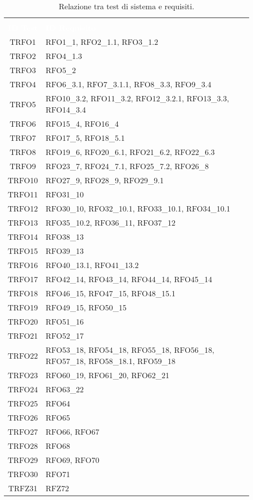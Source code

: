 \begin{longtable}{|c| C{13cm}|}
	\caption{\label{tab:TestSistema2}Relazione tra test di sistema e requisiti.}\\
	\textcolor{white}{\textbf{ID Test}}&
	\textcolor{white}{\textbf{ID Requisito}}\\
	TRFO1 & RFO1\_1, RFO2\_1.1, RFO3\_1.2\\ \hline
	TRFO2 & RFO4\_1.3\\ \hline
	TRFO3 & RFO5\_2\\ \hline
	TRFO4 & RFO6\_3.1, RFO7\_3.1.1, RFO8\_3.3, RFO9\_3.4\\ \hline
	TRFO5 & RFO10\_3.2, RFO11\_3.2, RFO12\_3.2.1, RFO13\_3.3, RFO14\_3.4\\ \hline
	TRFO6 & RFO15\_4, RFO16\_4\\ \hline
	TRFO7 & RFO17\_5, RFO18\_5.1\\ \hline
	TRFO8 & RFO19\_6, RFO20\_6.1, RFO21\_6.2, RFO22\_6.3\\ \hline
	TRFO9 & RFO23\_7, RFO24\_7.1, RFO25\_7.2, RFO26\_8\\ \hline
	TRFO10 & RFO27\_9, RFO28\_9, RFO29\_9.1\\ \hline
	TRFO11 & RFO31\_10\\ \hline
	TRFO12 & RFO30\_10, RFO32\_10.1, RFO33\_10.1, RFO34\_10.1\\ \hline
	TRFO13 & RFO35\_10.2, RFO36\_11, RFO37\_12\\ \hline
	TRFO14 & RFO38\_13\\ \hline
	TRFO15 & RFO39\_13\\ \hline
	TRFO16 & RFO40\_13.1, RFO41\_13.2\\ \hline
	TRFO17 & RFO42\_14, RFO43\_14, RFO44\_14, RFO45\_14\\ \hline
	TRFO18 & RFO46\_15, RFO47\_15, RFO48\_15.1\\ \hline
	TRFO19 & RFO49\_15, RFO50\_15\\ \hline
	TRFO20 & RFO51\_16\\ \hline
	TRFO21 & RFO52\_17\\ \hline
	TRFO22 & RFO53\_18, RFO54\_18, RFO55\_18, RFO56\_18, RFO57\_18, RFO58\_18.1, RFO59\_18\\ \hline
	TRFO23 & RFO60\_19, RFO61\_20, RFO62\_21\\ \hline
	TRFO24 & RFO63\_22\\ \hline
	TRFO25 & RFO64\\ \hline
	TRFO26 & RFO65\\ \hline
	TRFO27 & RFO66, RFO67\\ \hline
	TRFO28 & RFO68\\ \hline
	TRFO29 & RFO69, RFO70\\ \hline
	TRFO30 & RFO71\\ \hline
	TRFZ31 & RFZ72\\ \hline
\end{longtable}
\newpage
